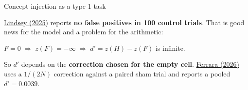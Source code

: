 \documentclass[aspectratio=169,11pt]{beamer}
\newcommand{\site}{https://measuring-self-reports.github.io/measuring-self-reports}
\begin{document}
\begin{frame}[label=injection]{Concept injection as a type-1 task}

\vspace{0.1em}
\begin{center}
\end{center}

\vspace{0.1em}
{\small \href{\site/papers/lindsey-2025/}{Lindsey (2025)} reports \textbf{no false positives in 100 control trials}. That is good news for the model and a problem for the arithmetic:}

\vspace{-0.2em}
\begin{center}
$F = 0 \;\Rightarrow\; z(F) = -\infty \;\Rightarrow\; d' = z(H) - z(F)$ is infinite.
\end{center}

{\small So $d'$ depends on the \textbf{correction chosen for the empty cell}. \href{\site/papers/ferrara-2026/}{Ferrara (2026)} uses a $1/(2N)$ correction against a paired sham trial and reports a pooled $d' = 0.0039$.}
\end{frame}
\end{document}

